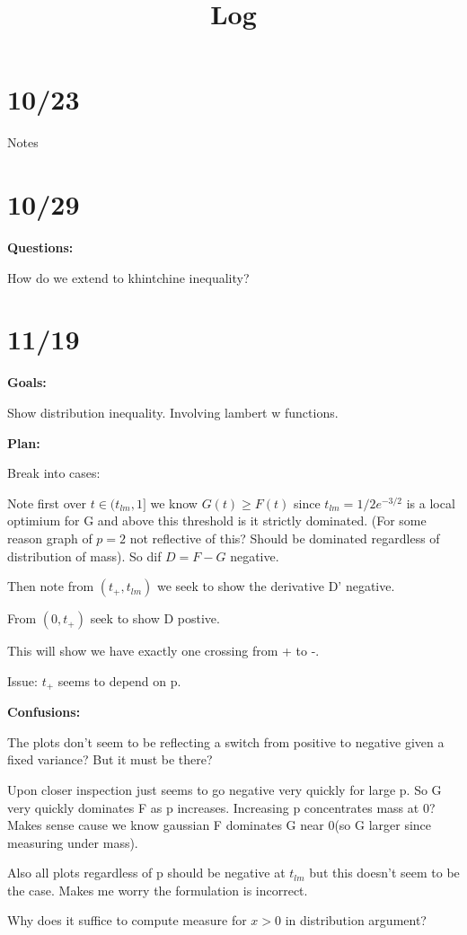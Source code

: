 \documentclass[10pt]{article}
\title{\vspace{-3em}Log}
\newcommand{\1}{\textbf{1}}
\theoremstyle{remark}
\theoremstyle{definition}
\theoremstyle{prop}
\theoremstyle{Corollary}
\begin{document}
\section{10/23}

Notes

\section{10/29}

\textbf{Questions:}

How do we extend to khintchine inequality?

\section{11/19}

\textbf{Goals:}

Show distribution inequality. Involving lambert w functions.

\textbf{Plan:}

Break into cases: 

Note first over $t \in (t_{lm},1]$ we know $G(t) \geq F(t)$ since $t_{lm} = 1/2e^{-3/2}$ is a local optimium for G and above this threshold is it strictly dominated. (For some reason graph of $p=2$ not reflective of this? Should be dominated regardless of distribution of mass). So dif $D = F - G$ negative.

Then note from $(t_+,t_{lm})$ we seek to show the derivative D' negative.

From $(0,t_+)$ seek to show D postive.

This will show we have exactly one crossing from + to -.

Issue: $t_+$ seems to depend on p.

\textbf{Confusions:}

The plots don't seem to be reflecting a switch from positive to negative given a fixed variance? But it must be there?

Upon closer inspection just seems to go negative very quickly for large p. So G very quickly dominates F as p increases. Increasing p concentrates mass at 0? Makes sense cause we know gaussian F dominates G near 0(so G larger since measuring under mass).

Also all plots regardless of p should be negative at $t_{lm}$ but this doesn't seem to be the case. Makes me worry the formulation is incorrect.

Why does it suffice to compute measure for $x > 0$ in distribution argument?
\end{document}
